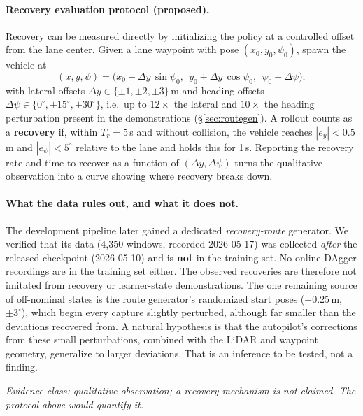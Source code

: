 \documentclass[11pt]{article}
\newcommand{\evidence}[1]{\par\smallskip\noindent\textit{\small Evidence class: #1}\par\smallskip}
\begin{document}
\paragraph{Recovery evaluation protocol (proposed).} Recovery can be measured directly by initializing the policy at a controlled offset from the lane center. Given a lane waypoint with pose $(x_0, y_0, \psi_0)$, spawn the vehicle at
\begin{equation}
(x, y, \psi) = \big(x_0 - \Delta y\,\sin\psi_0,\ \ y_0 + \Delta y\,\cos\psi_0,\ \ \psi_0 + \Delta\psi\big),
\end{equation}
with lateral offsets $\Delta y \in \{\pm1, \pm2, \pm3\}$\,m and heading offsets $\Delta\psi \in \{0^\circ, \pm15^\circ, \pm30^\circ\}$, i.e.\ up to $12\times$ the lateral and $10\times$ the heading perturbation present in the demonstrations (\S\ref{sec:routegen}). A rollout counts as a \textbf{recovery} if, within $T_r = 5$\,s and without collision, the vehicle reaches $|e_y| < 0.5$\,m and $|e_\psi| < 5^\circ$ relative to the lane and holds this for 1\,s. Reporting the recovery rate and time-to-recover as a function of $(\Delta y, \Delta\psi)$ turns the qualitative observation into a curve showing where recovery breaks down.

\paragraph{What the data rules out, and what it does not.} The development pipeline later gained a dedicated \emph{recovery-route} generator. We verified that its data (4,350 windows, recorded 2026-05-17) was collected \emph{after} the released checkpoint (2026-05-10) and is \textbf{not} in the training set. No online DAgger recordings are in the training set either. The observed recoveries are therefore not imitated from recovery or learner-state demonstrations. The one remaining source of off-nominal states is the route generator's randomized start poses ($\pm$0.25\,m, $\pm3^\circ$), which begin every capture slightly perturbed, although far smaller than the deviations recovered from. A natural hypothesis is that the autopilot's corrections from these small perturbations, combined with the LiDAR and waypoint geometry, generalize to larger deviations. That is an inference to be tested, not a finding.

\evidence{qualitative observation; a recovery mechanism is not claimed. The protocol above would quantify it.}

\end{document}
